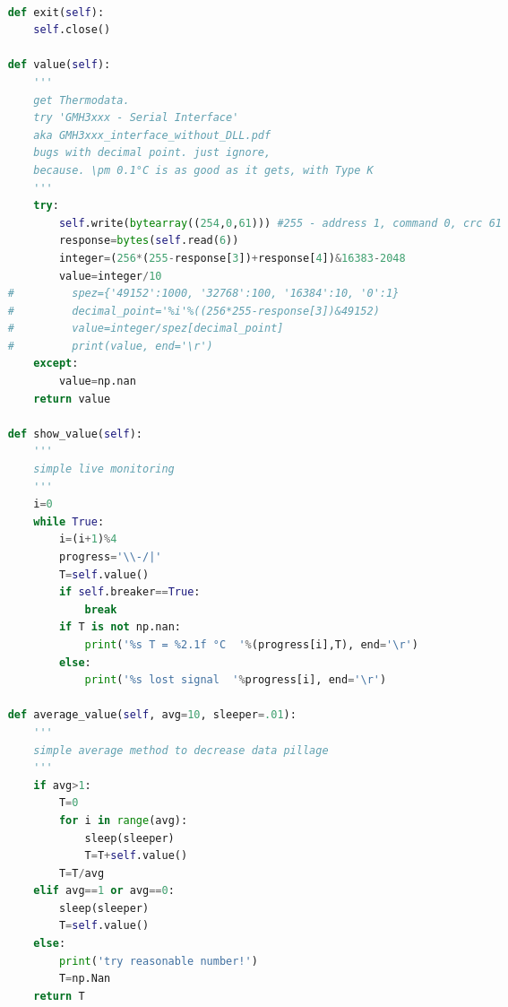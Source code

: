 \begin{landscape}
\begin{multicols}{2}
\begin{lstlisting}[language=Python]
        
    def exit(self):
        self.close()
        
    def value(self):
        '''
        get Thermodata.
        try 'GMH3xxx - Serial Interface' 
        aka GMH3xxx_interface_without_DLL.pdf
        bugs with decimal point. just ignore,
        because. \pm 0.1°C is as good as it gets, with Type K
        '''
        try:
            self.write(bytearray((254,0,61))) #255 - address 1, command 0, crc 61
            response=bytes(self.read(6))
            integer=(256*(255-response[3])+response[4])&16383-2048
            value=integer/10
    #         spez={'49152':1000, '32768':100, '16384':10, '0':1}
    #         decimal_point='%i'%((256*255-response[3])&49152)
    #         value=integer/spez[decimal_point]
    #         print(value, end='\r')
        except:
            value=np.nan
        return value

    def show_value(self):
        '''
        simple live monitoring
        '''
        i=0
        while True:
            i=(i+1)%4
            progress='\\-/|'
            T=self.value()
            if self.breaker==True:
                break
            if T is not np.nan:
                print('%s T = %2.1f °C  '%(progress[i],T), end='\r')
            else:
                print('%s lost signal  '%progress[i], end='\r')
    
    def average_value(self, avg=10, sleeper=.01):
        '''
        simple average method to decrease data pillage
        '''
        if avg>1:
            T=0
            for i in range(avg):
                sleep(sleeper)
                T=T+self.value()
            T=T/avg
        elif avg==1 or avg==0:
            sleep(sleeper)
            T=self.value()
        else:
            print('try reasonable number!')
            T=np.Nan
        return T
    

\end{lstlisting}
\end{multicols}
\end{landscape}
